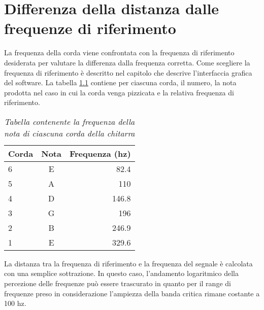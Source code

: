 \chapter{Differenza della distanza dalle frequenze di riferimento}\label{cap:distanza}

La frequenza della corda viene confrontata con la frequenza di riferimento desiderata per valutare la differenza dalla frequenza corretta.
Come scegliere la frequenza di riferimento è descritto nel capitolo che descrive l'interfaccia grafica del software.
La tabella \ref{tab:frequenze_riferimento} contiene per ciascuna corda, il numero, la nota prodotta nel caso in cui la corda venga pizzicata e la relativa frequenza di riferimento.

	\begin{table}[h]
	\center
	\begin{tabular}{|l|c|r|}
		\hline
		Corda	& 	Nota    & Frequenza (hz) \\
		\hline
		6	&	E	&	82.4     \\
		5	&	A	&	110      \\
		4	&	D	&	146.8    \\
		3	&	G	&	196      \\
		2	&	B	&	246.9    \\
		1	&	E	&	329.6    \\
		\hline
	\end{tabular}
	\caption{\textit{Tabella contenente la frequenza della nota di ciascuna corda della chitarra}}
	\label{tab:frequenze_riferimento}
	\end{table}

La distanza tra la frequenza di riferimento e la frequenza del segnale è calcolata con una semplice sottrazione.
In questo caso, l'andamento logaritmico della percezione delle frequenze può essere trascurato in quanto per il range di frequenze preso in considerazione l'ampiezza della banda critica rimane costante a 100 hz. 
